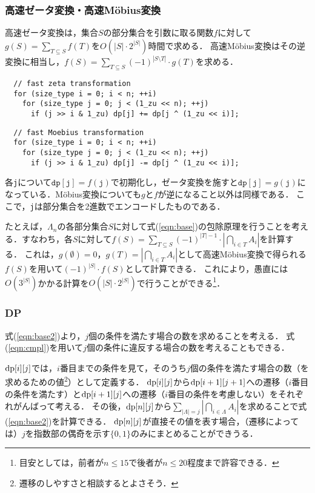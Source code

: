 \documentclass{jsarticle}
\newcommand{\DP}{\ensuremath\mathrm{dp}}
\begin{document}
\subsubsection{高速ゼータ変換・高速M\"obius変換}
高速ゼータ変換は，集合$S$の部分集合を引数に取る関数$f$に対して$g(S)=\sum_{T\subseteq S} f(T)$を$O(|S|\cdot 2^{|S|})$時間で求める．
高速M\"obius変換はその逆変換に相当し，$f(S)=\sum_{T\subseteq S} (-1)^{|S\setminus T|}\cdot g(T)$を求める．
\begin{verbatim}
  // fast zeta transformation
  for (size_type i = 0; i < n; ++i)
    for (size_type j = 0; j < (1_zu << n); ++j)
      if (j >> i & 1_zu) dp[j] += dp[j ^ (1_zu << i)];
\end{verbatim}
\begin{verbatim}
  // fast Moebius transformation
  for (size_type i = 0; i < n; ++i)
    for (size_type j = 0; j < (1_zu << n); ++j)
      if (j >> i & 1_zu) dp[j] -= dp[j ^ (1_zu << i)];
\end{verbatim}
各\texttt{j}について$\mathtt{dp}[\mathtt{j}] = f(\mathtt{j})$で初期化し，ゼータ変換を施すと$\mathtt{dp}[\mathtt{j}] = g(\mathtt{j})$になっている．M\"obius変換についても$g$と$f$が逆になること以外は同様である．
ここで，\texttt{j}は部分集合を2進数でエンコードしたものである．

たとえば，$\Lambda_n$の各部分集合$S$に対して式(\ref{eqn:base})の包除原理を行うことを考える．すなわち，各$S$に対して$f(S)=\sum_{T\subseteq S} (-1)^{|T|-1}\cdot \left|\bigcap_{i\in T}A_i\right|$を計算する．
これは，$g(\emptyset)=0$，$g(T) = \left|\bigcap_{i\in T} A_i\right|$として高速M\"obius変換で得られる$f(S)$を用いて$(-1)^{|S|}\cdot f(S)$として計算できる．
これにより，愚直には$O(3^{|S|})$かかる計算を$O(|S|\cdot 2^{|S|})$で行うことができる\footnote{目安としては，前者が$n\le 15$で後者が$n\le 20$程度まで許容できる．}．

\subsubsection{DP}
式(\ref{eqn:base2})より，$j$個の条件を満たす場合の数を求めることを考える．
式(\ref{eqn:cmpl})を用いて$j$個の条件に違反する場合の数を考えることもできる．

$\DP[i][j]$では，$i$番目までの条件を見て，そのうち$j$個の条件を満たす場合の数（を求めるための値\footnote{遷移のしやすさと相談するとよさそう．}）として定義する．
$\DP[i][j]$から$\DP[i+1][j+1]$への遷移（$i$番目の条件を満たす）と$\DP[i+1][j]$への遷移（$i$番目の条件を考慮しない）をそれぞれがんばって考える．
その後，$\DP[n][j]$から$\sum_{|\Lambda|=j}\left|\bigcap_{i\in\Lambda} A_i\right|$を求めることで式(\ref{eqn:base2})を計算できる．
$\DP[n][j]$が直接その値を表す場合，（遷移によっては）$j$を指数部の偶奇を示す$\{0, 1\}$のみにまとめることができうる．
\end{document}
